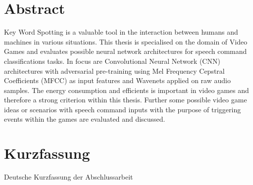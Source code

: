 
\chapter*{Abstract}\label{sec:shards_abstract}
Key Word Spotting is a valuable tool in the interaction between humans and machines in various situations.
This thesis is specialised on the domain of Video Games and evaluates possible neural network architectures for speech command classifications tasks.
In focus are Convolutional Neural Network (CNN) architectures with adversarial pre-training using Mel Frequency Cepstral Coefficients (MFCC) as input features and Wavenets applied on raw audio samples.
The energy consumption and efficients is important in video games and therefore a strong criterion within this thesis.
Further some possible video game ideas or scenarios with speech command inputs with the purpose of triggering events within the games are evaluated and discussed.



\chapter*{Kurzfassung}
Deutsche Kurzfassung der Abschlussarbeit